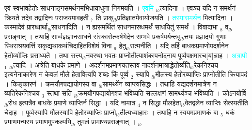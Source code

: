 \documentclass[article,12pt,a4paper]{memoir}%
\newcommand{\quotelemma}[1]{\textcolor{cyan}{#1}}
\newcounter{parCount}
\begin{document}
	  
	  \pstart \leavevmode%
	\hphantom{.}एवं स्वभावहेतोः साधनाङ्गसमर्थनमभिधायाधुना निगमयति । \quotelemma{एवमि} \cite[2a1]{vn-msN} {\tiny $_{lb}$}त्यादिना । एवञ्च यदि न समर्थनं क्रियते तदेव तद्वादिनः पराजयमावहती {\tiny $_{7}$} ति प्राक्{\tiny $_{lb}$}प्रतिज्ञातमेवायोजयति । \quotelemma{तस्यासमर्थन} \cite[2a2]{vn-msN} मित्यादिना । कस्मादेवं प्रारब्धार्था{\tiny $_{lb}$}साधनादिति । न ह्यसमर्थितं साधनमारब्धमर्थं साधयितुं समर्थं । विवादाभा {\tiny $_{8}$} \leavevmode{} व{\tiny $_{lb}$}प्रसङ्गात् । तथाहि सार्व्वज्ञज्ञानसाधने संस्कारोत्कर्षभेदेन सम्भवे प्रकर्षपर्यन्तवृ{\tiny $_{lb}$}त्तयः प्रज्ञादयो गुणाः स्थिराश्रयवर्त्ति सकृद्यथाकथंचिदाहितविशेषं विना {\tiny $_{9}$} हेतु{\tiny $_{lb}$}रात्मनीति । यदि तर्हि बाधकप्रमाणोपदर्शनेन हेतोर्व्याप्तिः प्रसाध्यते । तथा सत्त्य{\tiny $_{lb}$}नवस्था भवतः प्राप्नोतीत्याशंकापनोदनाय पूर्व्वपक्षमारच[य]न्नाह । \quotelemma{अत्रापी} {\tiny $_{1}$} \cite[1b9]{vn-msN} {\tiny $_{lb}$}त्यादि । अत्रेति बाधके प्रमाणे । अदर्शनमप्रमाणयतस्तव नादर्शनमात्राद्धेतोर्व्यति{\tiny $_{lb}$}रेकनिश्चय इत्यनेनाकारेण न केवलं मौले हेतावित्यपि शब्दः किं पूर्व्व {\tiny $_{2}$} स्यापि {\tiny $_{lb}$}मौलस्य हेतोरव्याप्तिः प्राप्नोतीति क्रियापदं । किङ्कारणं । क्रमयौगपद्यायोगस्य वा {\tiny $_{lb}$}सामर्थ्येन व्याप्त्यसिद्धः । तथाहि यद्यदर्शनमात्रेण न व्यतिरेकनिश्चय {\tiny $_{3}$} स्तथा सति {\tiny $_{lb}$}क्रमयौगपद्यायोगश्च भविष्यति सल्लक्षणं सामर्थ्यञ्च भविष्यति । कोऽनयोर्वि{\tiny $_{lb}$}रोध इत्यत्रैव बाधके प्रमाणे व्याप्तिर्न सिद्धा । यदि नामात्र {\tiny $_{4}$} न सिद्धा मौलहेता{\tiny $_{lb}$}वेतद्वलेन व्याप्तिः सेत्स्यतीति चेदाह । पूर्व्वस्यापि मौलस्यापि हेतोरव्याप्तिः प्राप्नो{\tiny $_{lb}$}तीत्यध्याहारः । तथाहि न स्वयमप्रमाणकं बा {\tiny $_{5}$} धकं प्रमाणमन्यस्य प्रमाणमुपकल्पयि{\tiny $_{lb}$} \leavevmode{} तुमलं प्रामाण्यप्रसङ्गात् ।
	{}
	\pend%
      {\tiny $_{lb}$}
\end{document}
